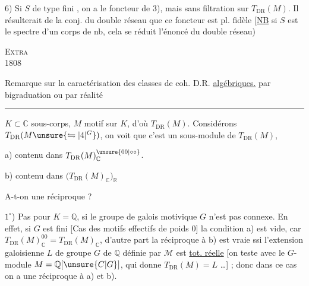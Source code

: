 6) Si $S$ de type fini , on a le foncteur de 3), mais sans filtration sur $T_{\mathrm{DR}}(M)$. Il résulterait de la conj. du double réseau  que ce foncteur est pl. fidèle
[\uline{NB} si $S$ est le spectre d'un corps de nb, cela se réduit  l'énoncé du double réseau)
\par\noindent\textsc{}\hfill\textsc{Extra}\\
 1808\hfill{}

Remarque sur la caractérisation des classes de coh. D.R.  \uline{algébriques.} par bigraduation ou par réalité 
\par\noindent\rule{\linewidth}{0.3pt}\par
$K\subset\mathbb C$ sous-corps, $M$ motif sur $K$, d'où $T_{\mathrm{DR}}(M)$. Considérons $T_{\mathrm{DR}}(M\unsure{\leftrightharpoons|4|{}^{G}})$, on voit que c'est un sous-module de $T_{\mathrm{DR}}(M)$, 
\par a) contenu dans $T_{\mathrm{DR}}(M)_{\mathbb C}^{\unsure{00|\circ\circ}}$.
\par b)  contenu dans $\bigl(T_{\mathrm{DR}}(M)_{\mathbb C}\bigr)_{\mathbb R}$ 

A-t-on une réciproque ?

$1^\circ$) Pas pour  $K=\mathbb Q$, si le groupe de galois motivique $G$  n'est pas connexe. En effet, si $G$ est  fini [Cas des motifs effectifs de poids 0] la condition a) est vide, car $T_{\mathrm{DR}}(M)_{\mathbb C}^{00}=T_{\mathrm{DR}}(M)_{\mathbb C}$,  d'autre part  la réciproque à b) est vraie ssi l'extension galoisienne $L$ de groupe $G$ de $\mathbb Q$ définie par $\mathcal M$ est \uline{tot. réelle} [on teste avec le $G$-module $M=\mathbb Q[\unsure{C|G}]$, qui donne $T_{\mathrm{DR}}(M)=L$ \ldots] ; donc dans ce cas on a une réciproque à a) et b).

